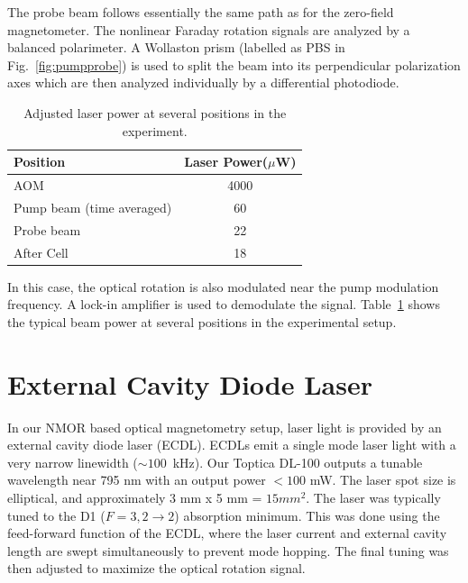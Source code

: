 The probe beam follows essentially the same path as for the zero-field
magnetometer.  The nonlinear Faraday rotation signals are analyzed by
a balanced polarimeter.  A Wollaston prism (labelled as PBS in
Fig.~\ref{fig:pumpprobe}) is used to split the beam into its
perpendicular polarization axes which are then analyzed individually
by a differential photodiode.

\begin{table}%
\centering
\begin{tabular}{|l|c|}\hline
\textbf{ Position}    & \textbf{Laser Power($\mu$W)} \\ \hline
AOM &4000  \\
Pump beam (time averaged) & 60  \\
Probe beam & 22  \\
After Cell & 18   \\\hline
\end{tabular}
\caption{Adjusted laser power at several positions in the
  experiment.\label{table:laser power}}
\end{table}

In this case, the optical rotation is also modulated near the pump
modulation frequency.  A lock-in amplifier is used to demodulate the
signal. Table~\ref{table:laser power} shows the typical beam power at
several positions in the experimental setup.



\section{External Cavity Diode Laser}

In our NMOR based optical magnetometry setup, laser light is provided
by an external cavity diode laser (ECDL).  
ECDLs emit a single mode laser light with a very narrow linewidth
($\sim 100$~kHz).
Our Toptica DL-100 outputs a tunable wavelength near 795 nm with an
output power $<100$ mW. The laser spot size is elliptical, and
approximately 3 mm x 5 mm = $15 mm^2$.  The laser was typically tuned
to the D1 ($F=3,2\rightarrow 2$) absorption minimum.  This was done
using the feed-forward function of the ECDL, where the laser current
and external cavity length are swept simultaneously to prevent mode
hopping.  The final tuning was then adjusted to maximize the optical
rotation signal.

